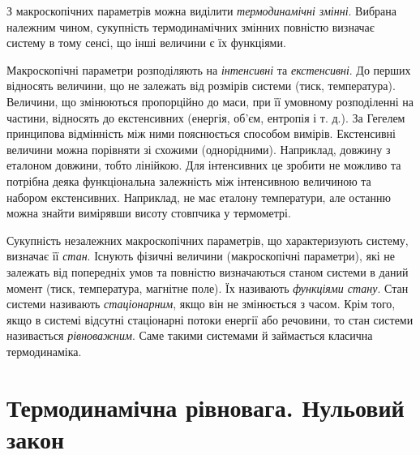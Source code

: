 З макроскопічних параметрів можна виділити \emph{термодинамічні змінні}. Вибрана належним чином, сукупність термодинамічних змінних повністю визначає систему в тому сенсі, що інші величини є їх функціями.

Макроскопічні параметри розподіляють на \emph{інтенсивні} та \emph{екстенсивні}. До перших відносять величини, що не залежать від розмірів системи (тиск, температура). Величини, що змінюються пропорційно до маси, при її умовному розподіленні на частини, відносять до екстенсивних (енергія, об’єм, ентропія і т. д.). За Гегелем принципова відмінність між ними пояснюється способом вимірів. Екстенсивні величини можна порівняти зі схожими (однорідними). Наприклад, довжину з еталоном довжини, тобто лінійкою. Для інтенсивних це зробити не можливо та потрібна деяка функціональна залежність між інтенсивною величиною та набором екстенсивних. Наприклад, не має еталону температури, але останню можна знайти вимірявши висоту стовпчика у термометрі.

Сукупність незалежних макроскопічних параметрів, що характеризують систему, визначає її \emph{стан}. Існують фізичні величини (макроскопічні параметри), які не залежать від попередніх умов та повністю визначаються станом системи в даний момент (тиск, температура, магнітне поле). Їх називають \emph{функціями стану}. Стан системи називають \emph{стаціонарним}, якщо він не змінюється з часом. Крім того, якщо в системі відсутні стаціонарні потоки енергії або речовини, то стан системи називається \emph{рівноважним}. Саме такими системами й займається класична термодинаміка.





\section{Термодинамічна рівновага. Нульовий закон}

